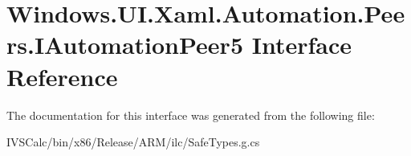 \hypertarget{interface_windows_1_1_u_i_1_1_xaml_1_1_automation_1_1_peers_1_1_i_automation_peer5}{}\section{Windows.\+U\+I.\+Xaml.\+Automation.\+Peers.\+I\+Automation\+Peer5 Interface Reference}
\label{interface_windows_1_1_u_i_1_1_xaml_1_1_automation_1_1_peers_1_1_i_automation_peer5}


The documentation for this interface was generated from the following file\+:\begin{DoxyCompactItemize}
\item 
I\+V\+S\+Calc/bin/x86/\+Release/\+A\+R\+M/ilc/Safe\+Types.\+g.\+cs\end{DoxyCompactItemize}
